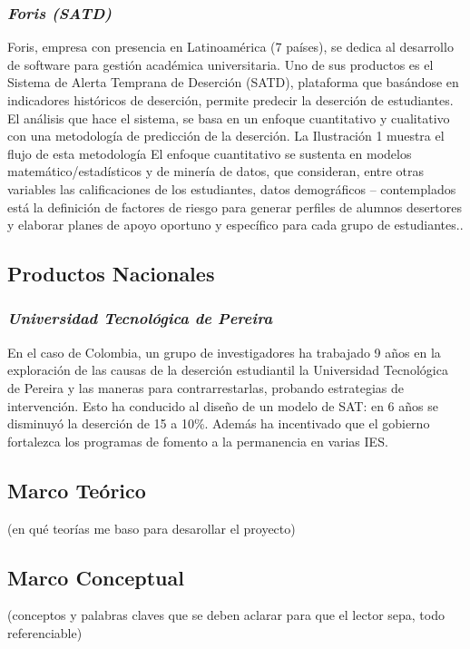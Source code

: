   \subsubsection{\textit{Foris (SATD)}}
  Foris, empresa con presencia en Latinoamérica (7 países), se dedica al desarrollo de software para gestión académica universitaria. Uno de sus productos es el Sistema de Alerta Temprana de Deserción (SATD), plataforma que basándose en indicadores históricos de deserción, permite predecir la deserción de estudiantes. El análisis que hace el sistema, se basa en un enfoque cuantitativo y cualitativo con una metodología de predicción de la deserción. La Ilustración 1 muestra el flujo de
  esta metodología
  El enfoque cuantitativo se sustenta en modelos matemático/estadísticos y de minería de datos, que consideran, entre otras variables las calificaciones de los estudiantes, datos demográficos – contemplados está la definición de factores de riesgo para generar perfiles de alumnos desertores y elaborar planes de apoyo oportuno y específico para cada grupo de estudiantes.\cite{SATPaper}.
 

 \subsection{Productos Nacionales}
   \subsubsection{\textit{Universidad Tecnológica de Pereira}}
 En el caso de Colombia, un grupo de investigadores ha trabajado 9 años en la exploración de las causas de la deserción estudiantil la Universidad Tecnológica de Pereira y las maneras para contrarrestarlas, probando estrategias de intervención. Esto ha conducido al diseño de un modelo de SAT: en 6 años se disminuyó la deserción de 15 a 10\%. Además ha incentivado que el gobierno fortalezca los programas de fomento a la permanencia en varias IES. \cite{carvajal}
 
\subsection{Marco Teórico}
(en qué teorías me baso para desarollar el proyecto)
\subsection{Marco Conceptual}

(conceptos y palabras claves que se deben aclarar para que el lector sepa, todo referenciable)

